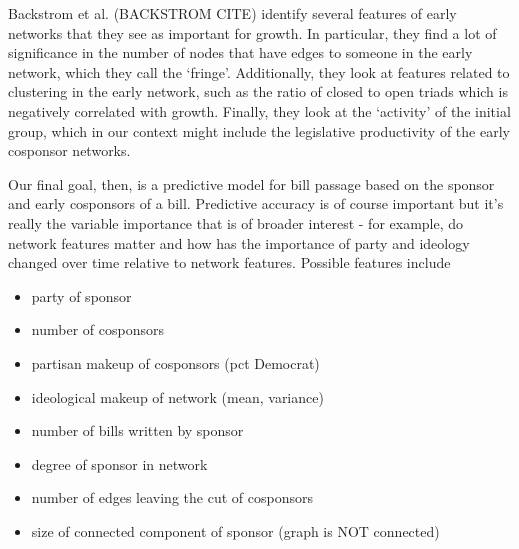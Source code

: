 Backstrom et al. (BACKSTROM CITE) identify several features of early networks that they see as important for growth. In particular, they find a lot of significance in the number of nodes that have edges to someone in the early network, which they call the `fringe'. Additionally, they look at features related to clustering in the early network, such as the ratio of closed to open triads which is negatively correlated with growth. Finally, they look at the `activity' of the initial group, which in our context might include the legislative productivity of the early cosponsor networks.

Our final goal, then, is a predictive model for bill passage based on the sponsor and early cosponsors of a bill. Predictive accuracy is of course important but it's really the variable importance that is of broader interest - for example, do network features matter and how has the importance of party and ideology changed over time relative to network features. Possible features include
\begin{itemize}
	\item party of sponsor
	\item number of cosponsors
	\item partisan makeup of cosponsors (pct Democrat)
	\item ideological makeup of network (mean, variance)
	\item number of bills written by sponsor
	\item degree of sponsor in network
	\item number of edges leaving the cut of cosponsors
	\item size of connected component of sponsor (graph is NOT connected)
\end{itemize}
